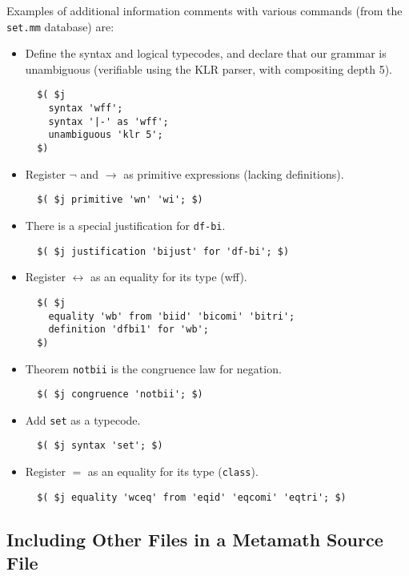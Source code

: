 Examples of additional information comments with various commands
(from the \texttt{set.mm} database) are:

\begin{itemize}
   \item Define the syntax and logical typecodes,
     and declare that our grammar is
     unambiguous (verifiable using the KLR parser, with compositing depth 5).
\begin{verbatim}
  $( $j
    syntax 'wff';
    syntax '|-' as 'wff';
    unambiguous 'klr 5';
  $)
\end{verbatim}

   \item Register $\lnot$ and $\rightarrow$ as primitive expressions
           (lacking definitions).
\begin{verbatim}
  $( $j primitive 'wn' 'wi'; $)
\end{verbatim}

   \item There is a special justification for \texttt{df-bi}.
\begin{verbatim}
  $( $j justification 'bijust' for 'df-bi'; $)
\end{verbatim}

   \item Register $\leftrightarrow$ as an equality for its type (wff).
\begin{verbatim}
  $( $j
    equality 'wb' from 'biid' 'bicomi' 'bitri';
    definition 'dfbi1' for 'wb';
  $)
\end{verbatim}

   \item Theorem \texttt{notbii} is the congruence law for negation.
\begin{verbatim}
  $( $j congruence 'notbii'; $)
\end{verbatim}

   \item Add \texttt{set} as a typecode.
\begin{verbatim}
  $( $j syntax 'set'; $)
\end{verbatim}

   \item Register $=$ as an equality for its type (\texttt{class}).
\begin{verbatim}
  $( $j equality 'wceq' from 'eqid' 'eqcomi' 'eqtri'; $)
\end{verbatim}

\end{itemize}


\subsection{Including Other Files in a Metamath Source File} \label{include}

